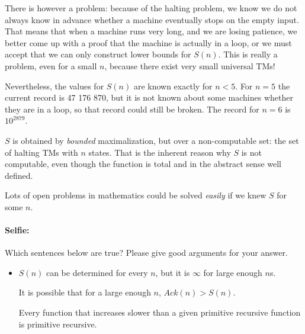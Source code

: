 There is however a problem: because of the halting problem, we know we
do not always know in advance whether a machine eventually stops on
the empty input. That means that when a machine runs very long, and we
are losing patience, we better come up with a proof that the machine
is actually in a loop, or we must accept that we can only
construct lower bounds for $S(n)$. This is really a problem, even for
a small $n$, because there exist very small universal TMs!

Nevertheless, the values for $S(n)$ are known exactly for $n <
5$. For $n = 5$ the current record is 47 176 870, but it is not known
about some machines whether they are in a loop, so that record could
still be broken. The record for $n = 6$ is $10^{2879}$.

$S$ is obtained by {\em bounded} maximalization, but over a
non-computable set: the set of halting TMs with $n$ states. That is
the inherent reason why $S$ is not computable, even though the
function is total and in the abstract sense well defined.

Lots of open problems in mathematics could be solved {\em easily} if
we knew $S$ for some $n$.


\paragraph{Selfie:} Which sentences below are true? Please give good arguments for your answer.

\begin{itemize}
\item[] $S(n)$ can be determined for every $n$, but it is $\infty$ for
  large enough $n$s.

It is possible that for a large enough $n$, $Ack(n) > S(n)$.

Every function that increases slower than a given primitive recursive
function is primitive recursive.
\end{itemize}

